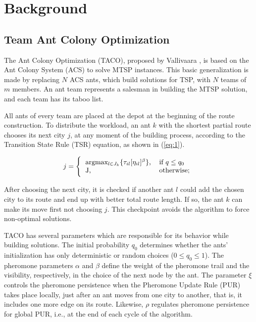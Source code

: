 \documentclass[runningheads]{llncs}
\begin{document}
\section{Background}
\subsection{Team Ant Colony Optimization}
The Ant Colony Optimization (TACO), proposed by Vallivaara \cite{vallivaara2008team}, is based on the Ant Colony System (ACS) to solve MTSP instances. This basic generalization is made by replacing \(N\) ACS ants, which build solutions for TSP, with \(N\) teams of \(m\) members. An ant team represents a salesman in building the MTSP solution, and each team has its taboo list.

All ants of every team are placed at the depot at the beginning of the route construction. To distribute the workload, an ant $k$ with the shortest partial route chooses its next city $j$, at any moment of the building process, according to the Transition State Rule (TSR) equation, as shown in (\ref{eq:1}).

\begin{equation} \label{eq:1} 
    j = \Bigg\{
        \begin{tabular}{ll}
        argmax\(_{l \in J_k} \{\tau_{il}[\eta_{il}]^\beta\}\), & if $q \leq q_0$ \\
        J, & otherwise;
        \end{tabular}
\end{equation}

After choosing the next city, it is checked if another ant $l$ could add the chosen city to its route and end up with better total route length. If so, the ant $k$ can make its move first not choosing $j$. This checkpoint avoids the algorithm to force non-optimal solutions.

TACO has several parameters which are responsible for its behavior while building solutions. The initial probability  \(q_0\) determines whether the ants’ initialization has only deterministic or random choices (\(0 \leq q_0  \leq 1\)). The pheromone parameters \(\alpha\) and \(\beta\) define the weight of the pheromone trail and the visibility, respectively, in the choice of the next node by the ant. The parameter \(\xi\) controls the pheromone persistence when the Pheromone Update Rule (PUR) takes place locally, just after an ant moves from one city to another, that is, it includes one more edge on its route. Likewise, \(\rho\) regulates pheromone persistence for global PUR, i.e., at the end of each cycle of the algorithm.
\end{document}
